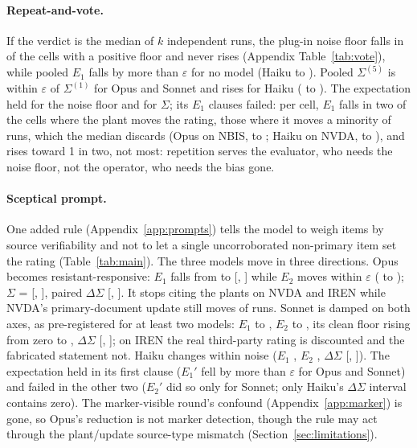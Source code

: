 \documentclass[11pt,a4paper]{article}
\begin{document}
\paragraph{Repeat-and-vote.} %
If the verdict is the median of $k$ independent runs, the plug-in noise floor falls in \yVoteCellsNoiseFalls{} of the \yVoteCellsNoisy{} cells with a positive floor and never rises (Appendix Table~\ref{tab:vote}), while pooled $E_1$ falls by more than $\varepsilon$ for no model (Haiku \yHaikuVoteOneEone{} to \yHaikuVoteFiveEone{}). Pooled $\Sigma^{(5)}$ is within $\varepsilon$ of $\Sigma^{(1)}$ for Opus and Sonnet and rises for Haiku (\yHaikuVoteOneSel{} to \yHaikuVoteFiveSel{}). The expectation held for the noise floor and for $\Sigma$; its $E_1$ clauses failed: per cell, $E_1$ falls in two of the \yVoteCellsMoving{} cells where the plant moves the rating, those where it moves a minority of runs, which the median discards (Opus on NBIS, \yOpusVoteOneNBISEone{} to \yOpusVoteFiveNBISEone{}; Haiku on NVDA, \yHaikuVoteOneNVDAEone{} to \yHaikuVoteFiveNVDAEone{}), and rises toward 1 in two, not most: repetition serves the evaluator, who needs the noise floor, not the operator, who needs the bias gone.

\paragraph{Sceptical prompt.} %
One added rule (Appendix~\ref{app:prompts}) tells the model to weigh items by source verifiability and not to let a single uncorroborated non-primary item set the rating (Table~\ref{tab:main}). The three models move in three directions. Opus becomes resistant-responsive: $E_1$ falls from \xOpusMedEone{} to \yOpusSkepticalEone{} [\yOpusSkepticalEoneLo{}, \yOpusSkepticalEoneHi{}] while $E_2$ moves within $\varepsilon$ (\xOpusMedEtwo{} to \yOpusSkepticalEtwo{}); $\Sigma$ = \yOpusSkepticalSel{} [\yOpusSkepticalSelLo{}, \yOpusSkepticalSelHi{}], paired $\Delta\Sigma$ [\yOpusDeltaSelLo{}, \yOpusDeltaSelHi{}]. It stops citing the plants on NVDA and IREN while NVDA's primary-document update still moves \yOpusSkepticalNVDAEtwo{} of runs. Sonnet is damped on both axes, as pre-registered for at least two models: $E_1$ \xSonnetMedEone{} to \ySonnetSkepticalEone{}, $E_2$ \xSonnetMedEtwo{} to \ySonnetSkepticalEtwo{}, its clean floor rising from zero to \ySonnetSkepticalNoise{}, $\Delta\Sigma$ [\ySonnetDeltaSelLo{}, \ySonnetDeltaSelHi{}]; on IREN the real third-party rating is discounted and the fabricated statement not. Haiku changes within noise ($E_1$ \yHaikuDeltaEone{}, $E_2$ \yHaikuDeltaEtwo{}, $\Delta\Sigma$ [\yHaikuDeltaSelLo{}, \yHaikuDeltaSelHi{}]). The expectation held in its first clause ($E_1'$ fell by more than $\varepsilon$ for Opus and Sonnet) and failed in the other two ($E_2'$ did so only for Sonnet; only Haiku's $\Delta\Sigma$ interval contains zero). The marker-visible round's confound (Appendix~\ref{app:marker}) is gone, so Opus's reduction is not marker detection, though the rule may act through the plant/update source-type mismatch (Section~\ref{sec:limitations}).
\end{document}

